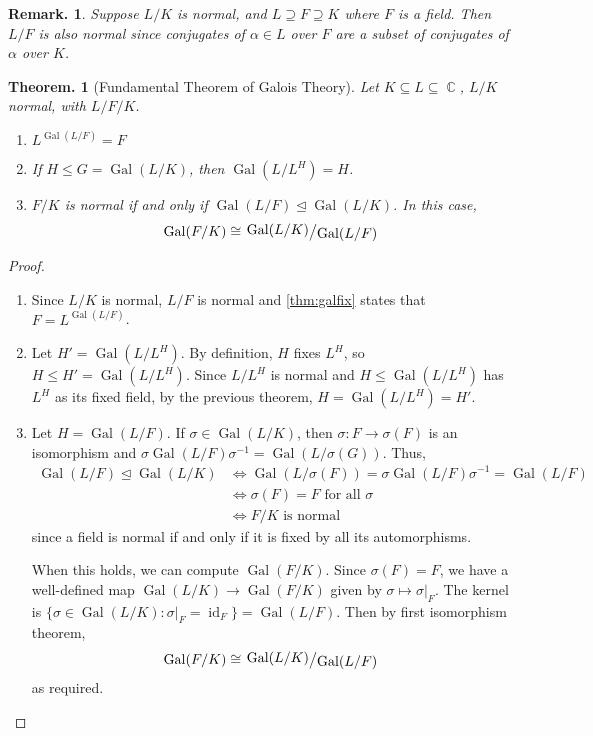 \documentclass[11pt, a4paper]{memoir}
\DeclareMathOperator{\C}{{\mathbb{C}}}
\theoremstyle{change}
\newtheorem{theorem}{Theorem.}[section]
\theoremstyle{plain}
\theoremstyle{nonumberplain}
\newtheorem{remark}{Remark.}
\newtheorem{proof}{Proof}
\DeclareMathOperator{\Gal}{Gal}
\DeclareMathOperator{\id}{id}
\newcommand{\quot}[2]{\mathchoice{\left.\raisebox{0.13em}{$#1$}\middle/\raisebox{-0.13em}{$#2$}\right.}
                                 {\left.\raisebox{0.07em}{$#1$}\middle/\raisebox{-0.07em}{$#2$}\right.}
                                 {\left.\raisebox{0.03em}{$#1$}\middle/\raisebox{-0.03em}{$#2$}\right.}
                                 {\left.\raisebox{0em}{$#1$}\middle/\raisebox{0em}{$#2$}\right.}}
\numberwithin{equation}{section}
\begin{document}
\begin{remark}
    Suppose $L/K$ is normal, and $L\supseteq F\supseteq K$ where $F$ is a field.
    Then $L/F$ is also normal since conjugates of $\alpha\in L$ over $F$ are a subset of conjugates of $\alpha$ over $K$.
\end{remark}
\begin{theorem}[Fundamental Theorem of Galois Theory]\label{thm:ftfg}
    Let $K\subseteq L\subseteq\C$, $L/K$ normal, with $L/F/K$.
    \begin{enumerate}[nolistsep,label=(\roman*)]
        \item $L^{\Gal(L/F)}=F$
        \item If $H\leq G=\Gal(L/K)$, then $\Gal(L/L^H)=H$.
        \item $F/K$ is normal if and only if $\Gal(L/F)\trianglelefteq\Gal(L/K)$.
            In this case,
            \begin{equation*}
                \Gal(F/K)\cong\quot{\Gal(L/K)}{\Gal(L/F)}
            \end{equation*}
    \end{enumerate}
\end{theorem}
\begin{proof}
    \begin{enumerate}[label=(\roman*)]
        \item Since $L/K$ is normal, $L/F$ is normal and \cref{thm:galfix} states that $F=L^{\Gal(L/F)}$.
        \item Let $H'=\Gal(L/L^H)$.
            By definition, $H$ fixes $L^H$, so $H\leq H'=\Gal(L/L^H)$.
            Since $L/L^H$ is normal and $H\leq\Gal(L/L^H)$ has $L^H$ as its fixed field, by the previous theorem, $H=\Gal(L/L^H)=H'$.
        \item Let $H=\Gal(L/F)$.
            If $\sigma\in\Gal(L/K)$, then $\sigma:F\longrightarrow\sigma(F)$ is an isomorphism and $\sigma\Gal(L/F)\sigma^{-1}=\Gal(L/\sigma(G))$.
            Thus,
            \begin{align*}
                \Gal(L/F)\trianglelefteq\Gal(L/K) &\Longleftrightarrow \Gal(L/\sigma(F))=\sigma\Gal(L/F)\sigma^{-1}=\Gal(L/F)\\
                                                  &\Longleftrightarrow \sigma(F)=F\text{ for all }\sigma\\
                                                  &\Longleftrightarrow F/K\text{ is normal}
            \end{align*}
            since a field is normal if and only if it is fixed by all its automorphisms.

            When this holds, we can compute $\Gal(F/K)$.
            Since $\sigma(F)=F$, we have a well-defined map $\Gal(L/K)\to\Gal(F/K)$ given by $\sigma\mapsto\sigma|_F$.
            The kernel is $\{\sigma\in\Gal(L/K):\sigma|_F=\id_F\}=\Gal(L/F)$.
            Then by first isomorphism theorem,
            \begin{equation*}
                \Gal(F/K)\cong\quot{\Gal(L/K)}{\Gal(L/F)}
            \end{equation*}
            as required.
    \end{enumerate}
\end{proof}
\end{document}
